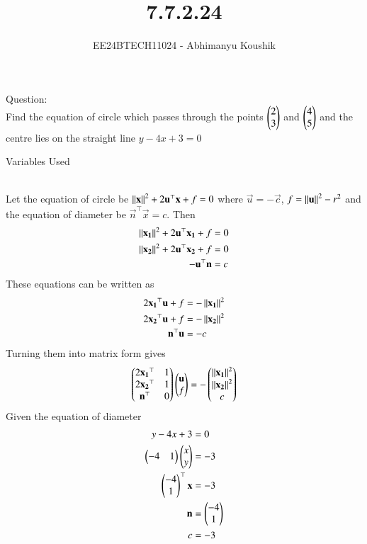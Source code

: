 \documentclass[journal]{IEEEtran}
\begin{document}

\vspace{3cm}

\title{7.7.2.24}
\author{EE24BTECH11024 - Abhimanyu Koushik}
{\let\newpage\relax\maketitle}
Question:\\
Find the equation of circle which passes through the points $\begin{pmatrix}2\\3\end{pmatrix}$ and $\begin{pmatrix}4\\5\end{pmatrix}$ and the centre lies on the straight line $y-4x+3=0$
\begin{table}[h!]    
  \centering
  
  \caption{Variables Used}
  \label{tab1-1.9-6}
\end{table}\\
Let the equation of circle be $\left\lVert\mathbf{x}\right\rVert^2+2\mathbf{u}^\top\mathbf{x}+f=0$ where $\vec{u}=-\vec{c}$, $f=\left\lVert\mathbf{u}\right\rVert^2-r^2$ and the equation of diameter be $\vec{n}^\top\vec{x}=c$. Then
\begin{align}
\left\lVert\mathbf{x_1}\right\rVert^2+2\mathbf{u}^\top\mathbf{x_1}+f&=0\\
\left\lVert\mathbf{x_2}\right\rVert^2+2\mathbf{u}^\top\mathbf{x_2}+f&=0\\
-\mathbf{u}^\top\mathbf{n}&=c
\end{align}
These equations can be written as 
\begin{align}
2\mathbf{x_1}^\top\mathbf{u}+f&=-\left\lVert\mathbf{x_1}\right\rVert^2\\
2\mathbf{x_2}^\top\mathbf{u}+f&=-\left\lVert\mathbf{x_2}\right\rVert^2\\
\mathbf{n}^\top\mathbf{u}&=-c
\end{align}
Turning them into matrix form gives
\begin{align}
\begin{pmatrix}2\mathbf{x_1}^\top & 1\\2\mathbf{x_2}^\top & 1\\ \mathbf{n}^\top & 0\end{pmatrix}\begin{pmatrix}\mathbf{u}\\f\end{pmatrix}&=-\begin{pmatrix}\left\lVert\mathbf{x_1}\right\rVert^2\\\left\lVert\mathbf{x_2}\right\rVert^2\\c\end{pmatrix}\\
\end{align}
Given the equation of diameter
\begin{align}
y-4x+3&=0\\
\begin{pmatrix}-4 & 1\end{pmatrix}\begin{pmatrix}x\\y\end{pmatrix}&=-3\\
\begin{pmatrix}-4\\1\end{pmatrix}^\top\mathbf{x}&=-3\\
\mathbf{n}&=\begin{pmatrix}-4\\1\end{pmatrix}\\
c&=-3
\end{align}
\end{document}
